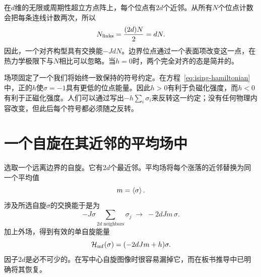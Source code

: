 \begin{classroomqa}
\end{classroomqa}

\begin{classroomqa}
\end{classroomqa}

在\(d\)维的无限或周期性超立方点阵上，每个位点有\(2d\)个近邻。从所有\(N\)个位点计数会把每条连线计数两次，所以
\begin{equation}
N_{\rm links}=\frac{(2d)N}{2}=dN.
\label{eq:number-links}
\end{equation}
因此，一个对齐构型具有交换能\(-JdN\)。边界位点通过一个表面项改变这一点，在热力学极限下与\(N\)相比可以忽略。当\(h=0\)时，两个完全对齐的态是简并的。

场项固定了一个我们将始终一致保持的符号约定。在方程~\eqref{eq:ising-hamiltonian}中，正的\(h\)使\(\sigma=-1\)具有更低的位点能量。因此\(h>0\)有利于负磁化强度，而\(h<0\)有利于正磁化强度。人们可以通过写出\(-h\sum_i\sigma_i\)来反转这一约定；没有任何物理内容改变，但此后每个符号都必须随之反转。

\begin{classroomqa}
\end{classroomqa}

\section{一个自旋在其近邻的平均场中}

选取一个远离边界的自旋。它有\(2d\)个最近邻。平均场将每个涨落的近邻替换为同一个平均值
\begin{equation}
m=\left\langle\sigma\right\rangle.
\end{equation}
涉及所选自旋\(\sigma\)的交换能于是为
\begin{equation}
-J\sigma\sum_{\text{\(2d\) neighbors}}\sigma_j
\;\longrightarrow\;-2dJm\,\sigma.
\end{equation}
加上外场，得到有效的单自旋能量
\begin{equation}
\mathcal H_{\rm mf}(\sigma)=(-2dJm+h)\sigma.
\label{eq:mean-field-one-spin}
\end{equation}
因子\(2d\)是必不可少的。在写中心自旋图像时很容易漏掉它，而在板书推导中已明确将其恢复。

